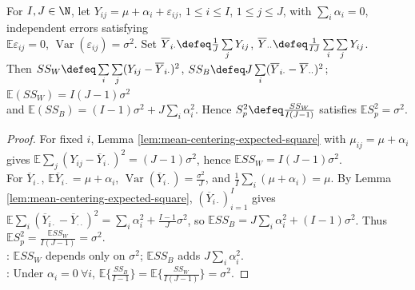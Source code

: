 \begin{theorem} \label{thm:one-way-anova-expected-mean-squares} \\
For $I,J\in\N$, let $Y_{ij}=\mu+\alpha_i+\varepsilon_{ij}$, $1\leq i\leq I$, $1\leq j\leq J$, with $\sum\limits_i\alpha_i=0$, independent errors satisfying\\
$\mathbb{E}\varepsilon_{ij}=0$, $\operatorname{Var}(\varepsilon_{ij})=\sigma^2$. Set $\overline{Y}_{i\cdot}\defeq \frac{1}{J}\sum\limits_jY_{ij}$, $\overline{Y}_{\cdot\cdot}\defeq \frac{1}{IJ}\sum\limits_i\sum\limits_jY_{ij}$.\\
Then $SS_W\defeq\sum\limits_i\sum\limits_j(Y_{ij}-\overline{Y}_{i\cdot})^2$, $SS_B\defeq J\sum\limits_i(\overline{Y}_{i\cdot}-\overline{Y}_{\cdot\cdot})^2$; $\mathbb{E}(SS_W)=I(J-1)\sigma^2$\\
and $\mathbb{E}(SS_B)=(I-1)\sigma^2+J\sum\limits_i\alpha_i^2$. Hence $S_p^2\defeq \frac{SS_W}{I(J-1)}$ satisfies $\mathbb{E}S_p^2=\sigma^2$.\\
\begin{proof} For fixed $i$, Lemma \ref{lem:mean-centering-expected-square} with $\mu_{ij}=\mu+\alpha_i$ gives $\mathbb{E}\sum\limits_j(Y_{ij}-\overline{Y}_{i\cdot})^2=(J-1)\sigma^2$, hence $\mathbb{E}SS_W=I(J-1)\sigma^2$.\\
For $\overline{Y}_{i\cdot}$, $\mathbb{E}\overline{Y}_{i\cdot}=\mu+\alpha_i$, $\operatorname{Var}(\overline{Y}_{i\cdot})=\frac{\sigma^2}{J}$, and $\frac{1}{I}\sum\limits_i(\mu+\alpha_i)=\mu$. By Lemma \ref{lem:mean-centering-expected-square}, $(\overline{Y}_{i\cdot})_{i=1}^{I}$ gives\\
$\mathbb{E}\sum\limits_i(\overline{Y}_{i\cdot}-\overline{Y}_{\cdot\cdot})^2=\sum\limits_i\alpha_i^2+\frac{I-1}{J}\sigma^2$, so $\mathbb{E}SS_B=J\sum\limits_i\alpha_i^2+(I-1)\sigma^2$. Thus $\mathbb{E}S_p^2=\frac{\mathbb{E}SS_W}{I(J-1)}=\sigma^2$.\\
: $\mathbb{E}SS_W$ depends only on $\sigma^2$; $\mathbb{E}SS_B$ adds $J\sum\limits_i\alpha_i^2$.\\
: Under $\alpha_i=0\ \forall i$, $\mathbb{E}\{\frac{SS_B}{I-1}\}=\mathbb{E}\{\frac{SS_W}{I(J-1)}\}=\sigma^2$.
\end{proof}
\end{theorem}

